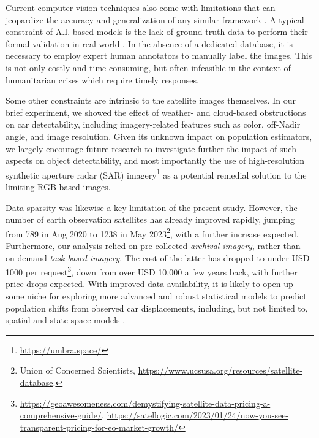 \documentclass[sn-basic]{sn-jnl}%
\begin{document}
Current computer vision techniques also come with limitations that can jeopardize the accuracy and generalization of any similar framework \citep{shankar2017no, deVries2019does}. A typical constraint of A.I.-based models is the lack of ground-truth data to perform their formal validation in real world \citep{torralba2011unbiased, raji2021ai}. In the absence of a dedicated database, it is necessary to employ expert human annotators to manually label the images. This is not only costly and time-consuming, but often infeasible in the context of humanitarian crises which require timely responses. 

Some other constraints are intrinsic to the satellite images themselves. In our brief experiment, we showed the effect of weather- and cloud-based obstructions on car detectability, including imagery-related features such as color, off-Nadir angle, and image resolution. Given its unknown impact on population estimators, we largely encourage future research to investigate further the impact of such aspects on object detectability, and most importantly the use of high-resolution synthetic aperture radar (SAR) imagery\footnote{\url{https://umbra.space/}} as a potential remedial solution to the limiting RGB-based images.





Data sparsity was likewise a key limitation of the present study. However, the number of earth observation satellites has already improved rapidly, jumping from 789 in Aug 2020 to 1238 in May 2023\footnote{Union of Concerned Scientists, \url{https://www.ucsusa.org/resources/satellite-database}.}, with a further increase expected. Furthermore, our analysis relied on pre-collected \emph{archival imagery}, rather than on-demand \emph{task-based imagery}. The cost of the latter has dropped to under USD 1000 per request\footnote{\url{https://geoawesomeness.com/demystifying-satellite-data-pricing-a-comprehensive-guide/}, \url{https://satellogic.com/2023/01/24/now-you-see-transparent-pricing-for-eo-market-growth/}}, down from over USD 10,000 a few years back, with further price drops expected. With improved data availability, it is likely to open up some niche for exploring more advanced and robust statistical models to predict population shifts from observed car displacements, including, but not limited to, spatial and state-space models \citep{Gao_2015, Pu_et_al_2023}.
\end{document}
